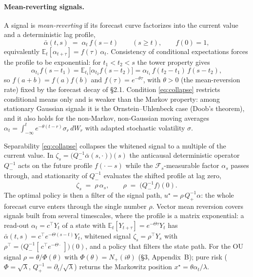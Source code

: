 \documentclass[11pt]{article}
\newcommand{\E}{\mathbb{E}}
\newcommand{\F}{\mathcal{F}}
\theoremstyle{plain}
\begin{document}
\paragraph{Mean-reverting signals.} A signal is \emph{mean-reverting} if its forecast curve factorizes into the current value and a deterministic lag profile,
\begin{equation}\label{eq:collapse}
\bar\alpha(t,s) \;=\; \alpha_t\, f(s-t) \qquad (s\ge t), \qquad f(0)=1,
\end{equation}
equivalently $\E_t[\alpha_{t+\tau}] = f(\tau)\,\alpha_t$. Consistency of conditional expectations forces the profile to be exponential: for $t_1<t_2<s$ the tower property gives
\[
\alpha_{t_1}f(s-t_1) = \E_{t_1}\!\bigl[\alpha_{t_2}f(s-t_2)\bigr] = \alpha_{t_1}\,f(t_2-t_1)\,f(s-t_2),
\]
so $f(a+b)=f(a)f(b)$ and $f(\tau)=e^{-\theta\tau}$, with $\theta>0$ (the mean-reversion rate) fixed by the forecast decay of \S2.1. Condition \eqref{eq:collapse} restricts conditional means only and is weaker than the Markov property: among stationary Gaussian signals it is the Ornstein--Uhlenbeck case (Doob's theorem), and it also holds for the non-Markov, non-Gaussian moving averages $\alpha_t = \int_{-\infty}^t e^{-\theta(t-r)}\sigma_r\,dW_r$ with adapted stochastic volatility $\sigma$.

Separability \eqref{eq:collapse} collapses the whitened signal to a multiple of the current value. In $\zeta_s = \bigl(Q_-^{-1}\bar\alpha(s,\cdot)\bigr)(s)$ the anticausal deterministic operator $Q_-^{-1}$ acts on the future profile $f(\cdot-s)$ while the $\F_s$-measurable factor $\alpha_s$ passes through, and stationarity of $Q_-^{-1}$ evaluates the shifted profile at lag zero,
\begin{equation}\label{eq:zeta-collapse}
\zeta_s \;=\; \rho\,\alpha_s, \qquad \rho \;=\; \bigl(Q_-^{-1}f\bigr)(0).
\end{equation}
The optimal policy is then a filter of the signal path, $u^\star = \rho\,Q_+^{-1}\alpha$: the whole forecast curve enters through the single number $\rho$. Vector mean reversion covers signals built from several timescales, where the profile is a matrix exponential: a read-out $\alpha_t = c^\top Y_t$ of a state with $\E_t[Y_{t+\tau}] = e^{-\Theta\tau}Y_t$ has $\bar\alpha(t,s) = c^\top e^{-\Theta(s-t)}Y_t$, whitened signal $\zeta_s = \rho^\top Y_s$ with $\rho^\top = \bigl(Q_-^{-1}[\,c^\top e^{-\Theta\cdot}\,]\bigr)(0)$, and a policy that filters the state path. For the OU signal $\rho = \theta/\Phi(\theta)$ with $\Phi(\theta)=N_+(i\theta)$ (\S3, Appendix~B); pure risk ($\Phi=\sqrt\lambda$, $Q_+^{-1}=\partial_t/\sqrt\lambda$) returns the Markowitz position $x^\star=\theta\alpha_t/\lambda$.
\end{document}
